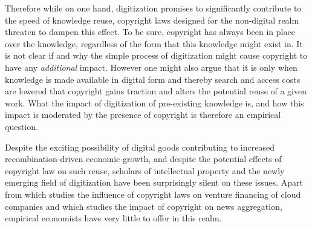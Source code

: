 \documentclass[12pt]{article}
\begin{document}
Therefore while on one hand, digitization promises to significantly contribute to the speed of knowledge reuse, copyright laws designed for the non-digital realm threaten to dampen this effect.  To be sure, copyright has always been in place over the knowledge, regardless of the form that this knowledge might exist in. It is not clear if and why the simple process of digitization might cause copyright to have any \emph{additional} impact. However one might also argue that it is only when knowledge is made available in digital form and thereby search and access costs are lowered that copyright gains traction and alters the potential reuse of a given work. What the impact of digitization of pre-existing knowledge is, and how this impact is moderated by the presence of copyright is therefore an empirical question.











Despite the exciting possibility of digital goods contributing to increased recombination-driven economic growth, and despite the potential effects of copyright law on such reuse, scholars of intellectual property and the newly emerging field of digitization have been surprisingly silent on these issues. Apart from \cite{lerner} which studies the influence of copyright laws on venture financing of cloud companies and \cite{chiou_copyright_2011}
  which studies the impact of copyright on news aggregation, empirical economists have very little to offer in this realm. 
\end{document}
